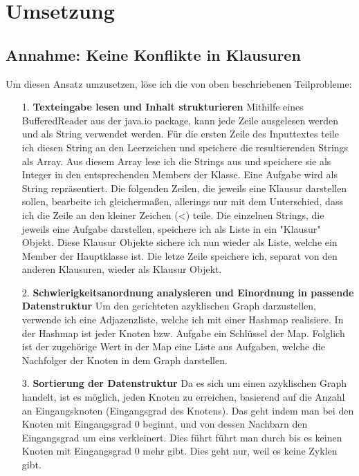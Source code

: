 \documentclass[a4paper,10pt,ngerman]{scrartcl}
\begin{document}
\section{Umsetzung}
\subsection{Annahme: Keine Konflikte in Klausuren}
Um diesen Ansatz umzusetzen, löse ich die von oben beschriebenen Teilprobleme:
\begin{itemize}
  \item[1.] \textbf{Texteingabe lesen und Inhalt strukturieren}
  \newline
  Mithilfe eines BufferedReader aus der java.io package, kann jede Zeile ausgelesen werden und als String verwendet werden. Für die ersten Zeile des Inputtextes
  teile ich diesen String an den Leerzeichen und speichere die resultierenden Strings als Array. Aus diesem Array lese ich die Strings aus und speichere sie als Integer in
  den entsprechenden Members der Klasse. Eine Aufgabe wird als String repräsentiert.
  \newline
  Die folgenden Zeilen, die jeweils eine Klausur darstellen sollen, bearbeite ich gleichermaßen, allerings nur mit dem Unterschied, dass ich die Zeile an den kleiner Zeichen (<) teile.
  Die einzelnen Strings, die jeweils eine Aufgabe darstellen, speichere ich als Liste in ein "Klausur" Objekt. Diese Klausur Objekte sichere ich nun wieder als Liste, welche ein Member der Hauptklasse ist.
  \newline
  Die letze Zeile speichere ich, separat von den anderen Klausuren, wieder als Klausur Objekt.
  \item[2.] \textbf{Schwierigkeitsanordnung analysieren und Einordnung in passende Datenstruktur}
  \newline
  Um den gerichteten azyklischen Graph darzustellen, verwende ich eine Adjazenzliste, welche ich mit einer Hashmap realisiere. In der Hashmap ist jeder Knoten bzw. Aufgabe ein Schlüssel der Map.
  Folglich ist der zugehörige Wert in der Map eine Liste aus Aufgaben, welche die Nachfolger der Knoten in dem Graph darstellen.
  \item[3.] \textbf{Sortierung der Datenstruktur}
  \newline
  Da es sich um einen azyklischen Graph handelt, ist es möglich, jeden Knoten zu erreichen, basierend auf die Anzahl an Eingangsknoten (Eingangsgrad des Knotens). Das geht indem man bei den Knoten mit
  Eingangsgrad 0 beginnt, und von dessen Nachbarn den Eingangsgrad um eins verkleinert. Dies führt führt man durch bis es keinen Knoten mit Eingangsgrad 0 mehr gibt. Dies geht nur, weil es keine Zyklen gibt.

\end{itemize}
\end{document}
